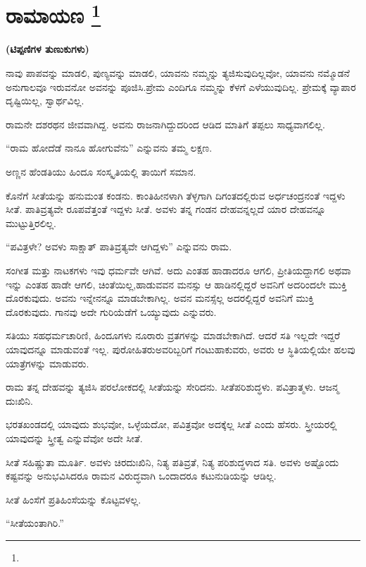 
\chapter[ರಾಮಾಯಣ ]{ರಾಮಾಯಣ \protect\footnote{}}

\centerline{\textbf{(ಟಿಪ್ಪಣಿಗಳ ತುಣುಕುಗಳು)}}

ನಾವು ಪಾಪವನ್ನು ಮಾಡಲಿ, ಪುಣ್ಯವನ್ನು ಮಾಡಲಿ, ಯಾವನು ನಮ್ಮನ್ನು ತ್ಯಜಿಸುವುದಿಲ್ಲವೋ, ಯಾವನು ನಮ್ಮೊಡನೆ ಅನುಗಾಲವೂ ಇರುವನೋ ಅವನನ್ನು ಪೂಜಿಸಿ.\break ಪ್ರೇಮ ಎಂದಿಗೂ ನಮ್ಮನ್ನು ಕೆಳಗೆ ಎಳೆಯುವುದಿಲ್ಲ. ಪ್ರೇಮಕ್ಕೆ ವ್ಯಾಪಾರ ದೃಷ್ಟಿಯಿಲ್ಲ, ಸ್ವಾರ್ಥವಿಲ್ಲ.

ರಾಮನೇ ದಶರಥನ ಜೀವವಾಗಿದ್ದ. ಅವನು ರಾಜನಾಗಿದ್ದುದರಿಂದ ಆಡಿದ ಮಾತಿಗೆ ತಪ್ಪಲು ಸಾಧ್ಯವಾಗಲಿಲ್ಲ.

“ರಾಮ ಹೋದೆಡೆ ನಾನೂ ಹೋಗುವೆನು” ಎನ್ನುವನು ತಮ್ಮ ಲಕ್ಷಣ.

ಅಣ್ಣನ ಹೆಂಡತಿಯು ಹಿಂದೂ ಸಂಸ್ಕೃತಿಯಲ್ಲಿ ತಾಯಿಗೆ ಸಮಾನ.

ಕೊನೆಗೆ ಸೀತೆಯನ್ನು ಹನುಮಂತ ಕಂಡನು. ಕಾಂತಿಹೀನಳಾಗಿ ತೆಳ್ಳಗಾಗಿ ದಿಗಂತದಲ್ಲಿರುವ ಅರ್ಧಚಂದ್ರನಂತೆ ಇದ್ದಳು ಸೀತೆ. ಪಾತಿವ್ರತ್ಯವೇ ರೂಪವೆತ್ತಂತೆ ಇದ್ದಳು ಸೀತೆ. ಅವಳು ತನ್ನ ಗಂಡನ ದೇಹವನ್ನಲ್ಲದೆ ಯಾರ ದೇಹವನ್ನೂ ಮುಟ್ಟುತ್ತಿರಲಿಲ್ಲ.

“ಪವಿತ್ರಳೇ? ಅವಳು ಸಾಕ್ಷಾತ್​ ಪಾತಿವ್ರತ್ಯವೇ ಆಗಿದ್ದಳು” ಎನ್ನುವನು ರಾಮ.

ಸಂಗೀತ ಮತ್ತು ನಾಟಕಗಳು ಇವು ಧರ್ಮವೇ ಆಗಿವೆ. ಅದು ಎಂತಹ ಹಾಡಾದರೂ ಆಗಲಿ, ಪ್ರೀತಿಯದ್ದಾಗಲಿ ಅಥವಾ ಇನ್ನು ಎಂತಹ ಹಾಡೇ ಆಗಲಿ, ಚಿಂತೆಯಿಲ್ಲ,\break ಹಾಡುವವನ ಮನಸ್ಸು ಆ ಹಾಡಿನಲ್ಲಿದ್ದರೆ ಅವನಿಗೆ ಅದರಿಂದಲೇ ಮುಕ್ತಿ ದೊರಕುವುದು. ಅವನು ಇನ್ನೇನನ್ನೂ ಮಾಡಬೇಕಾಗಿಲ್ಲ. ಅವನ ಮನಸ್ಸೆಲ್ಲ ಅದರಲ್ಲಿದ್ದರೆ ಅವನಿಗೆ ಮುಕ್ತಿ ದೊರಕುವುದು. ಗಾನವು ಅದೇ ಗುರಿಯೆಡೆಗೆ ಒಯ್ಯುವುದು ಎನ್ನುವರು.

ಸತಿಯು ಸಹಧರ್ಮಚಾರಿಣಿ, ಹಿಂದೂಗಳು ನೂರಾರು ವ್ರತಗಳನ್ನು ಮಾಡಬೇಕಾಗಿದೆ. ಆದರೆ ಸತಿ ಇಲ್ಲದೇ ಇದ್ದರೆ ಯಾವುದನ್ನೂ ಮಾಡುವಂತೆ ಇಲ್ಲ. ಪುರೋಹಿತರು\break ಅವರಿಬ್ಬರಿಗೆ ಗಂಟುಹಾಕುವರು, ಅವರು ಆ ಸ್ಥಿತಿಯಲ್ಲಿಯೇ ಹಲವು ಯಾತ್ರೆಗಳನ್ನು ಮಾಡುವರು.

ರಾಮ ತನ್ನ ದೇಹವನ್ನು ತ್ಯಜಿಸಿ ಪರಲೋಕದಲ್ಲಿ ಸೀತೆಯನ್ನು ಸೇರಿದನು. ಸೀತೆ\break ಪರಿಶುದ್ಧಳು. ಪವಿತ್ರಾತ್ಮಳು. ಆಜನ್ಮ ದುಃಖಿನಿ.

ಭರತಖಂಡದಲ್ಲಿ ಯಾವುದು ಶುಭವೋ, ಒಳ್ಳೆಯದೋ, ಪವಿತ್ರವೋ ಅದಕ್ಕೆಲ್ಲ ಸೀತೆ ಎಂದು ಹೆಸರು. ಸ್ತ್ರೀಯರಲ್ಲಿ ಯಾವುದನ್ನು ಸ್ತ್ರೀತ್ವ ಎನ್ನುವೆವೋ ಅದೇ ಸೀತೆ.

ಸೀತೆ ಸಹಿಷ್ಣುತಾ ಮೂರ್ತಿ. ಅವಳು ಚಿರದುಃಖಿನಿ, ನಿತ್ಯ ಪತಿವ್ರತೆ, ನಿತ್ಯ ಪರಿಶುದ್ಧಳಾದ ಸತಿ. ಅವಳು ಅಷ್ಟೊಂದು ಕಷ್ಟವನ್ನು ಅನುಭವಿಸಿದರೂ ರಾಮನ ವಿರುದ್ಧವಾಗಿ ಒಂದಾದರೂ ಕಟುನುಡಿಯನ್ನು ಆಡಿಲ್ಲ.

ಸೀತೆ ಹಿಂಸೆಗೆ ಪ್ರತಿಹಿಂಸೆಯನ್ನು ಕೊಟ್ಟವಳಲ್ಲ.

“ಸೀತೆಯಂತಾಗಿರಿ.”

